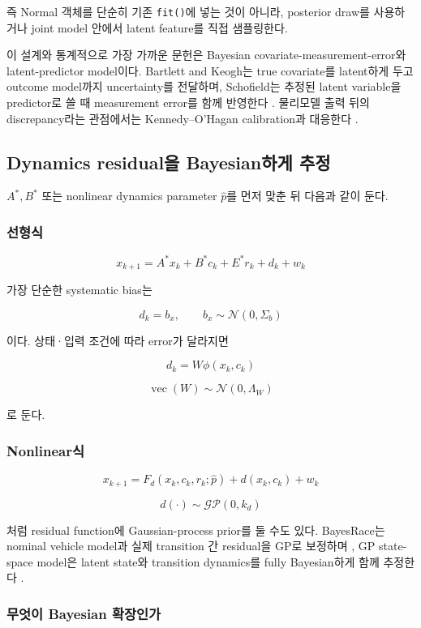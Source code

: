 \documentclass[letterpaper,10pt,journal,twocolumn]{ieeeconf}
\newcommand{\Normal}{\mathcal{N}}
\newcommand{\GP}{\mathcal{GP}}
\newcommand{\vecop}{\operatorname{vec}}
\begin{document}
즉 Normal 객체를 단순히 기존 \texttt{fit()}에 넣는 것이 아니라, posterior draw를 사용하거나 joint model 안에서 latent feature를 직접 샘플링한다.

이 설계와 통계적으로 가장 가까운 문헌은 Bayesian covariate-measurement-error와 latent-predictor model이다. Bartlett and Keogh는 true covariate를 latent하게 두고 outcome model까지 uncertainty를 전달하며, Schofield는 추정된 latent variable을 predictor로 쓸 때 measurement error를 함께 반영한다 \cite{bartlett2018,schofield2015}. 물리모델 출력 뒤의 discrepancy라는 관점에서는 Kennedy--O'Hagan calibration과 대응한다 \cite{kennedy2001}.

\subsection{Dynamics residual을 Bayesian하게 추정}

\(A^{*},B^{*}\) 또는 nonlinear dynamics parameter \(\hat p\)를 먼저 맞춘 뒤 다음과 같이 둔다.

\subsubsection{선형식}

\[
x_{k+1}
=
A^{*}x_k+B^{*}c_k+E^{*}r_k+d_k+w_k
\]

가장 단순한 systematic bias는

\[
d_k=b_x,
\qquad
b_x\sim\Normal(0,\Sigma_b)
\]

이다. 상태·입력 조건에 따라 error가 달라지면

\[
d_k
=
W\phi(x_k,c_k)
\]

\[
\vecop(W)
\sim
\Normal(0,\Lambda_W)
\]

로 둔다.

\subsubsection{Nonlinear식}

\[
x_{k+1}
=
F_d(x_k,c_k,r_k;\hat p)
+d(x_k,c_k)
+w_k
\]

\[
d(\cdot)\sim\GP(0,k_d)
\]

처럼 residual function에 Gaussian-process prior를 둘 수도 있다. BayesRace는 nominal vehicle model과 실제 transition 간 residual을 GP로 보정하며 \cite{jain2021}, GP state-space model은 latent state와 transition dynamics를 fully Bayesian하게 함께 추정한다 \cite{frigola2013}.

\subsubsection{무엇이 Bayesian 확장인가}
\end{document}
